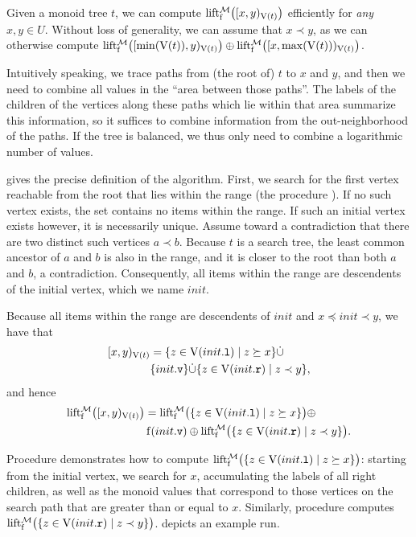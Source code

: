 \documentclass[conference]{IEEEtran}
\begin{document}
Given a monoid tree $t$, we can compute $\operatorname{lift_{\operatorname{f}}^{\mathcal{M}}}\bigl([{x},{y})_{\operatorname{V}(t)}\bigr)$ efficiently for \textit{any} $x, y \in U$. Without loss of generality, we can assume that $x \prec y$, as we can otherwise compute $\operatorname{lift_{\operatorname{f}}^{\mathcal{M}}}\bigl([{\min(\operatorname{V}(t))},{y})_{\operatorname{V}(t)}\bigr) \oplus \operatorname{lift_{\operatorname{f}}^{\mathcal{M}}}\bigl([{x},{\max(\operatorname{V}(t))})_{\operatorname{V}(t)}\bigr)$.

Intuitively speaking, we trace paths from (the root of) $t$ to $x$ and $y$, and then we need to combine all values in the ``area between those paths''. The labels of the children of the vertices along these paths which lie within that area summarize this information, so it suffices to combine information from the out-neighborhood of the paths. If the tree is balanced, we thus only need to combine a logarithmic number of values.

 gives the precise definition of the algorithm. First, we search for the first vertex reachable from the root that lies within the range (the procedure ). If no such vertex exists, the set contains no items within the range. If such an initial vertex exists however, it is necessarily unique. Assume toward a contradiction that there are two distinct such vertices $a \prec b$. Because $t$ is a search tree, the least common ancestor of $a$ and $b$ is also in the range, and it is closer to the root than both $a$ and $b$, a contradiction. Consequently, all items within the range are descendents of the initial vertex, which we name $init$.

Because all items within the range are descendents of $init$ and $x \preceq init \prec y$, we have that \begin{align*}
	[{x},{y})_{\operatorname{V}(t)} &= \{z \in \operatorname{V}({init}\mathtt{.l}) \mid z \succeq x\} \dot{\cup}\\
	&\{{init}\mathtt{.v}\} \dot{\cup} \{z \in \operatorname{V}({init}\mathtt{.r}) \mid z \prec y\},
\end{align*} and hence \begin{align*}
	\operatorname{lift_{\operatorname{f}}^{\mathcal{M}}}\bigl([{x},{y})_{\operatorname{V}(t)}\bigr) &= \operatorname{lift_{\operatorname{f}}^{\mathcal{M}}}\bigl(\{z \in \operatorname{V}({init}\mathtt{.l}) \mid z \succeq x\}\bigr) \oplus\\
	&\operatorname{f}({init}\mathtt{.v}) \oplus \operatorname{lift_{\operatorname{f}}^{\mathcal{M}}}\bigl(\{z \in \operatorname{V}({init}\mathtt{.r}) \mid z \prec y\}\bigr).
\end{align*}

Procedure  demonstrates how to compute $\operatorname{lift_{\operatorname{f}}^{\mathcal{M}}}\bigl(\{z \in \operatorname{V}({init}\mathtt{.l}) \mid z \succeq x\}\bigr)$: starting from the initial vertex, we search for $x$, accumulating the labels of all right children, as well as the monoid values that correspond to those vertices on the search path that are greater than or equal to $x$. Similarly, procedure  computes $\operatorname{lift_{\operatorname{f}}^{\mathcal{M}}}\bigl(\{z \in \operatorname{V}({init}\mathtt{.r}) \mid z \prec y\}\bigr)$.  depicts an example run.
\end{document}
